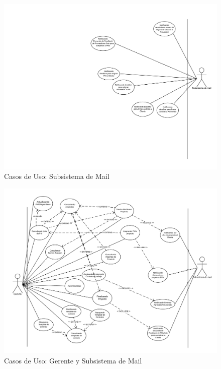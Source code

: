 \begin{figure}[H]
    \centering
    \includegraphics[width=\linewidth]{diag/nuevos/cu-mail.png}
    \caption{Casos de Uso: Subsistema de Mail}
    \label{cu3}
\end{figure}

\begin{figure}[H]
    \centering
    \includegraphics[width=\linewidth]{diag/nuevos/cu-gerente.png}
    \caption{Casos de Uso: Gerente y Subsistema de Mail}
    \label{cu4}
\end{figure}

